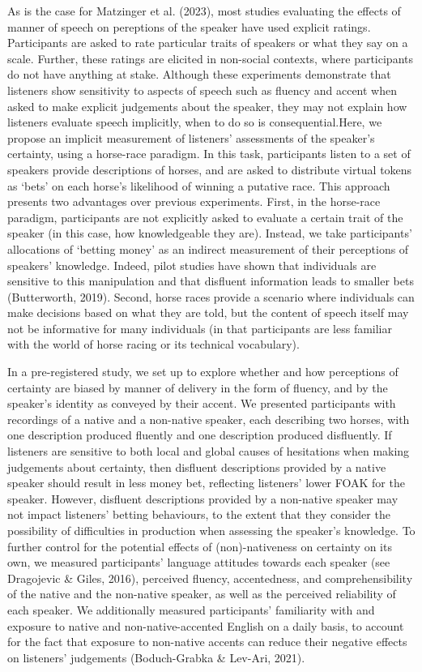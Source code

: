 \documentclass[
  man,floatsintext]{apa7}
\begin{document}
As is the case for Matzinger et al. (2023), most studies evaluating the effects of manner of speech on pereptions of the speaker have used explicit ratings. Participants are asked to rate particular traits of speakers or what they say on a scale. Further, these ratings are elicited in non-social contexts, where participants do not have anything at stake. Although these experiments demonstrate that listeners show sensitivity to aspects of speech such as fluency and accent when asked to make explicit judgements about the speaker, they may not explain how listeners evaluate speech implicitly, when to do so is consequential.Here, we propose an implicit measurement of listeners' assessments of the speaker's certainty, using a horse-race paradigm. In this task, participants listen to a set of speakers provide descriptions of horses, and are asked to distribute virtual tokens as `bets' on each horse's likelihood of winning a putative race. This approach presents two advantages over previous experiments. First, in the horse-race paradigm, participants are not explicitly asked to evaluate a certain trait of the speaker (in this case, how knowledgeable they are). Instead, we take participants' allocations of `betting money' as an indirect measurement of their perceptions of speakers' knowledge. Indeed, pilot studies have shown that individuals are sensitive to this manipulation and that disfluent information leads to smaller bets (Butterworth, 2019). Second, horse races provide a scenario where individuals can make decisions based on what they are told, but the content of speech itself may not be informative for many individuals (in that participants are less familiar with the world of horse racing or its technical vocabulary).

In a pre-registered study, we set up to explore whether and how perceptions of certainty are biased by manner of delivery in the form of fluency, and by the speaker's identity as conveyed by their accent. We presented participants with recordings of a native and a non-native speaker, each describing two horses, with one description produced fluently and one description produced disfluently. If listeners are sensitive to both local and global causes of hesitations when making judgements about certainty, then disfluent descriptions provided by a native speaker should result in less money bet, reflecting listeners' lower FOAK for the speaker. However, disfluent descriptions provided by a non-native speaker may not impact listeners' betting behaviours, to the extent that they consider the possibility of difficulties in production when assessing the speaker's knowledge. To further control for the potential effects of (non)-nativeness on certainty on its own, we measured participants' language attitudes towards each speaker (see Dragojevic \& Giles, 2016), perceived fluency, accentedness, and comprehensibility of the native and the non-native speaker, as well as the perceived reliability of each speaker. We additionally measured participants' familiarity with and exposure to native and non-native-accented English on a daily basis, to account for the fact that exposure to non-native accents can reduce their negative effects on listeners' judgements (Boduch-Grabka \& Lev-Ari, 2021).
\end{document}

